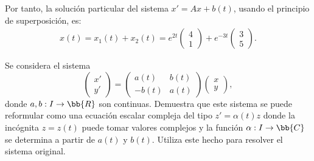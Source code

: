\begin{ejercicio}
    Por tanto, la solución particular del sistema $x'=Ax+b(t)$, usando el principio de superposición, es:
    \begin{align*}
        x(t) = x_1(t) + x_2(t) = e^{2t}\begin{pmatrix}
            4\\
            1
        \end{pmatrix} + e^{-3t}\begin{pmatrix}
            3\\
            5
        \end{pmatrix}.
    \end{align*}
\end{ejercicio}

\begin{ejercicio}\label{ej:5.5}
    Se considera el sistema
    \[
        \begin{pmatrix}
            x'\\
            y'
        \end{pmatrix}
        =
        \begin{pmatrix}
            a(t) & b(t)\\
            -b(t) & a(t)
        \end{pmatrix}
        \begin{pmatrix}
            x\\
            y
        \end{pmatrix},
    \]
    donde $a, b : I \to \bb{R}$ son continuas. Demuestra que este sistema se puede reformular como una ecuación escalar compleja del tipo $z' = \alpha(t)z$ donde la incógnita $z = z(t)$ puede tomar valores complejos y la función $\alpha : I \to \bb{C}$ se determina a partir de $a(t)$ y $b(t)$. Utiliza este hecho para resolver el sistema original.
\end{ejercicio}

